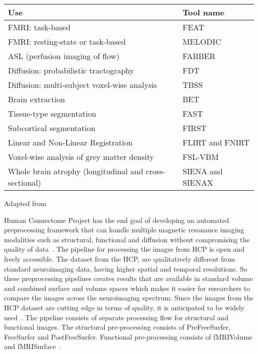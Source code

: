 \begin{center}
\tabulinesep=1.2mm
\begin{tabu} to \textwidth { | X[l] | X[l] | }
  \hline
  Use & Tool name \\
  \hline
  FMRI: task-based & FEAT \\
  \hline
  FMRI: resting-state or task-based & MELODIC \\
  \hline
  ASL (perfusion imaging of flow) & FABBER \\
  \hline
  Diffusion: probabilistic tractography & FDT \\
  \hline
  Diffusion: multi-subject voxel-wise analysis & TBSS \\
  \hline
  Brain extraction & BET \\
  \hline
  Tissue-type segmentation  & FAST \\
  \hline
  Subcortical segmentation & FIRST \\
  \hline
  Linear and Non-Linear Registration & FLIRT and FNIRT \\
  \hline
  Voxel-wise analysis of grey matter density & FSL-VBM \\
  \hline
  Whole brain atrophy (longitudinal and cross-sectional) & SIENA and SIENAX \\
  \hline
\end{tabu}
\label{tab:tools_fsl}
\caption*{Adapted from \cite{JENKINSON2012782}}
\end{center}

Human Connectome Project has the end goal of developing an automated preprocessing framework that can handle multiple magnetic resonance imaging modalities such as structural, functional and diffusion without compromising the quality of data~\cite{Gla13}. The pipeline for processing the images from HCP is open and freely accessible. The dataset from the HCP, are qualitatively different from standard neuroimaging data, having higher spatial and temporal resolutions. So these preprocessing pipelines creates results that are available in standard volume and combined surface and volume spaces which makes it easier for researchers to compare the images across the neuroimaging spectrum. Since the images from the HCP dataset are cutting edge in terms of quality, it is anticipated to be widely used~\cite{HODGE20161102}. The pipeline consists of separate processing flow for structural and functional images. The structural pre-processing consists of PreFreeSurfer, FreeSurfer and PostFreeSurfer. Functional pre-processing consists of fMRIVolume and fMRISurface~\cite{FSL}.


